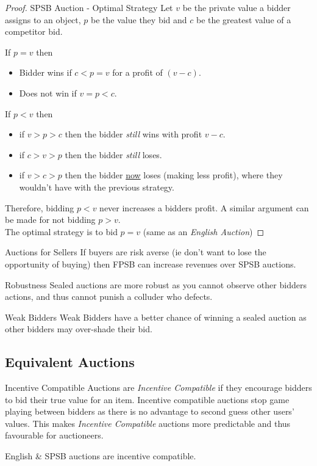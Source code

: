 \documentclass[11pt,a4paper]{article}
\begin{document}
  \begin{proof}{SPSB Auction - Optimal Strategy}
    Let $v$ be the private value a bidder assigns to an object, $p$ be the value they bid and $c$ be the greatest value of a competitor bid.
    \par If $p=v$ then
    \begin{itemize}
      \item Bidder wins if $c<p=v$ for a profit of $(v-c)$.
      \item Does not win if $v=p<c$.
    \end{itemize}
    If $p<v$ then
    \begin{itemize}
      \item if $v>p>c$ then the bidder \textit{still} wins with profit $v-c$.
      \item if $c>v>p$ then the bidder \textit{still} loses.
      \item if $v>c>p$ then the bidder \underline{now} loses (making less profit), where they wouldn't have with the previous strategy.
    \end{itemize}
    Therefore, bidding $p<v$ never increases a bidders profit. A similar argument can be made for not bidding $p>v$.\\
    The optimal strategy is to bid $p=v$ (same as an \textit{English Auction})
  \end{proof}

  \begin{remark}{Auctions for Sellers}
    If buyers are risk averse (ie don't want to lose the opportunity of buying) then FPSB can increase revenues over SPSB auctions.
  \end{remark}

  \begin{remark}{Robustness}
    Sealed auctions are more robust as you cannot observe other bidders actions, and thus cannot punish a colluder who defects.
  \end{remark}

  \begin{remark}{Weak Bidders}
    Weak Bidders have a better chance of winning a sealed auction as other bidders may over-shade their bid.
  \end{remark}

\subsection{Equivalent Auctions}

  \begin{definition}{Incentive Compatible}
    Auctions are \textit{Incentive Compatible} if they encourage bidders to bid their true value for an item. Incentive compatible auctions stop game playing between bidders as there is no advantage to second guess other users' values. This makes \textit{Incentive Compatible} auctions more predictable and thus favourable for auctioneers.
    \par English \& SPSB auctions are incentive compatible.
  \end{definition}
\end{document}
